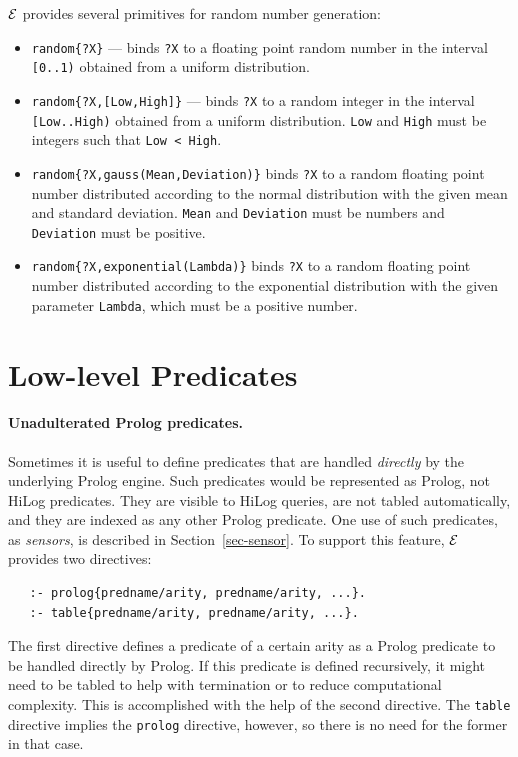 \documentclass[11pt]{article}
\newcommand{\ERGO}{\mbox{\ensuremath{\cal{E}}\smaller{{\sc{RGO}}}}\xspace}
\newcommand{\FLSYSTEM}{\ERGO}
\begin{document}
\FLSYSTEM provides several primitives for random number generation:
\begin{itemize}
\item  \texttt{random\{?X\}} --- binds \texttt{?X} to a floating point
  random number in the interval \texttt{[0..1)}  
  obtained from a uniform distribution.
\item \texttt{random\{?X,[Low,High]\}} --- binds \texttt{?X} to a random
  integer in the interval \texttt{[Low..High)}  
  obtained from a uniform distribution. \texttt{Low} and \texttt{High} must
  be integers such that \texttt{Low < High}.
\item \texttt{random\{?X,gauss(Mean,Deviation)\}} binds \texttt{?X} to a random
  floating point number distributed according to the normal distribution
  with the given mean and standard deviation.
  \texttt{Mean} and \texttt{Deviation} must be numbers and
  \texttt{Deviation} must be positive.   
\item \texttt{random\{?X,exponential(Lambda)\}} binds \texttt{?X} to a random
  floating point number distributed according to the exponential distribution
  with the given parameter \texttt{Lambda}, which must be a positive
  number.
\end{itemize}

\section{Low-level Predicates}
\label{sec-lowlevel}

\paragraph{Unadulterated Prolog predicates.}
Sometimes it is useful to define predicates that are handled
\emph{directly} by the underlying Prolog engine. Such predicates would be
represented as Prolog, not HiLog predicates. They are visible to
HiLog queries, are not tabled automatically,
and they are indexed as any other Prolog predicate.
One use of such predicates, as \emph{sensors}, is described in
Section~\ref{sec-sensor}.
To support this feature, \FLSYSTEM provides two directives:
\begin{verbatim}
   :- prolog{predname/arity, predname/arity, ...}.
   :- table{predname/arity, predname/arity, ...}.
\end{verbatim}
The first directive defines a predicate of a certain arity as a Prolog
predicate to be handled directly by Prolog. If this predicate is defined
recursively, it might need to be tabled to help with termination or to
reduce computational complexity. This is accomplished with the help of the
second directive. The \texttt{table} directive implies the \texttt{prolog}
directive, however, so there is no need for the former in that case.
\end{document}
